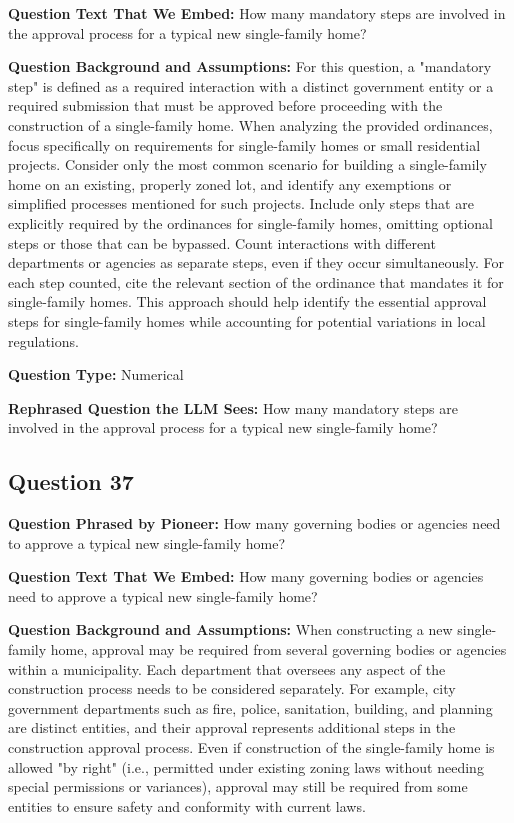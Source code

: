 \noindent\textbf{Question Text That We Embed:} How many mandatory steps are involved in the approval process for a typical new single-family home?

\noindent\textbf{Question Background and Assumptions:} For this question, a "mandatory step" is defined as a required interaction with a distinct government entity or a required submission that must be approved before proceeding with the construction of a single-family home. When analyzing the provided ordinances, focus specifically on requirements for single-family homes or small residential projects. Consider only the most common scenario for building a single-family home on an existing, properly zoned lot, and identify any exemptions or simplified processes mentioned for such projects. Include only steps that are explicitly required by the ordinances for single-family homes, omitting optional steps or those that can be bypassed. Count interactions with different departments or agencies as separate steps, even if they occur simultaneously. For each step counted, cite the relevant section of the ordinance that mandates it for single-family homes. This approach should help identify the essential approval steps for single-family homes while accounting for potential variations in local regulations.

\noindent\textbf{Question Type:} Numerical

\noindent\textbf{Rephrased Question the LLM Sees:} How many mandatory steps are involved in the approval process for a typical new single-family home?

\vspace{1cm}
\subsection*{Question 37}
\noindent\textbf{Question Phrased by Pioneer:} How many governing bodies or agencies need to approve a typical new single-family home?

\noindent\textbf{Question Text That We Embed:} How many governing bodies or agencies need to approve a typical new single-family home?

\noindent\textbf{Question Background and Assumptions:} When constructing a new single-family home, approval may be required from several governing bodies or agencies within a municipality. Each department that oversees any aspect of the construction process needs to be considered separately. For example, city government departments such as fire, police, sanitation, building, and planning are distinct entities, and their approval represents additional steps in the construction approval process. Even if construction of the single-family home is allowed "by right" (i.e., permitted under existing zoning laws without needing special permissions or variances), approval may still be required from some entities to ensure safety and conformity with current laws.

